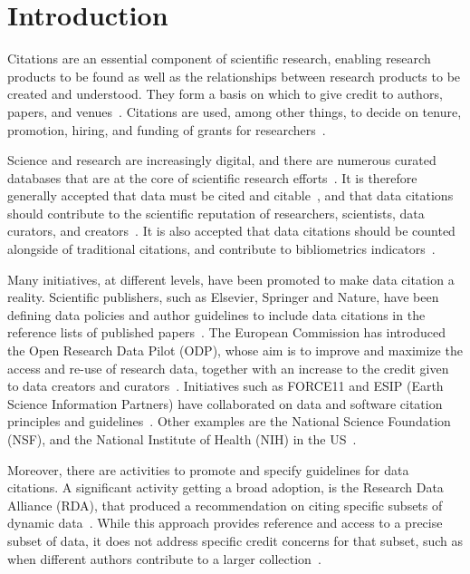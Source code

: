 \section{Introduction}

Citations are an essential component of scientific research, enabling research products to be found as well as the relationships between research products to be created and understood. 
They form a basis on which to give credit to authors, papers, and venues~\citep{ZouP16, cousijn2019bringing, cronin1984}.
Citations are used, among other things, to decide on tenure, promotion, hiring, and funding of grants for researchers~\citep{meho2007impact, Cronin01, Hartley17, Kosten16}.

Science and research are increasingly digital, and there are numerous curated databases that are at the core of scientific research efforts~\citep{bunemann2016citation}.
It is therefore generally accepted that data must be cited and citable~\citep{LawrenceEtAl2011,CallaghanDPTCKABBLLMHSWW12}, and that data citations should contribute to the scientific reputation of researchers, scientists, data curators, and creators~\citep{AltmanEtAl2015,Spengler2012}.
It is also accepted that data citations should be counted alongside of traditional citations, and contribute to bibliometrics indicators~\citep{Belter2014,Peters2016}.

\textcolor{correction}{Many initiatives, at different levels, have been promoted to make data citation a reality. 
Scientific publishers, such as Elsevier, Springer and Nature, have been defining data policies and author guidelines to include data citations in the reference lists of published papers~\cite{cousijn2019bringing}. 
The European Commission has introduced the Open Research Data Pilot (ODP), whose aim is to improve and maximize the access and re-use of research data, together with an increase to the credit given to data creators and curators~\cite{Silvello18jasist}. Initiatives such as FORCE11 and ESIP (Earth Science Information Partners) have collaborated on data and software citation principles and guidelines~\cite{esip2019}. Other examples are the National Science Foundation (NSF), and the National Institute of Health (NIH) in the US~\cite{Silvello18jasist}.}

\textcolor{correction}{Moreover, there are  activities to  promote and specify guidelines for data citations. A significant activity getting a broad adoption, is the Research Data Alliance (RDA), that produced a recommendation on citing specific subsets of dynamic data~\cite{rauber2015data}.%
While this approach provides reference and access to a precise subset of data, it does  not address specific credit concerns for that subset, such as when different authors contribute to a larger collection~\cite{parsons2019history}.} 

